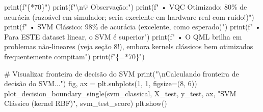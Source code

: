 \documentclass[
  brazilian,
]{report}
\newenvironment{Shaded}{\begin{snugshade}}{\end{snugshade}}
\newcommand{\BuiltInTok}[1]{\textcolor[rgb]{0.00,0.23,0.31}{#1}}
\newcommand{\CharTok}[1]{\textcolor[rgb]{0.13,0.47,0.30}{#1}}
\newcommand{\CommentTok}[1]{\textcolor[rgb]{0.37,0.37,0.37}{#1}}
\newcommand{\DecValTok}[1]{\textcolor[rgb]{0.68,0.00,0.00}{#1}}
\newcommand{\NormalTok}[1]{\textcolor[rgb]{0.00,0.23,0.31}{#1}}
\newcommand{\OperatorTok}[1]{\textcolor[rgb]{0.37,0.37,0.37}{#1}}
\newcommand{\SpecialCharTok}[1]{\textcolor[rgb]{0.37,0.37,0.37}{#1}}
\newcommand{\SpecialStringTok}[1]{\textcolor[rgb]{0.13,0.47,0.30}{#1}}
\newcommand{\StringTok}[1]{\textcolor[rgb]{0.13,0.47,0.30}{#1}}
\begin{document}
\begin{tcolorbox}
\begin{Shaded}
\begin{Highlighting}[]
\BuiltInTok{print}\NormalTok{(}\SpecialStringTok{f"}\SpecialCharTok{\{}\StringTok{\textquotesingle{}{-}\textquotesingle{}}\OperatorTok{*}\DecValTok{70}\SpecialCharTok{\}}\SpecialStringTok{"}\NormalTok{)}
\BuiltInTok{print}\NormalTok{(}\SpecialStringTok{f"}\CharTok{\textbackslash{}n}\SpecialStringTok{💡 Observação:"}\NormalTok{)}
\BuiltInTok{print}\NormalTok{(}\SpecialStringTok{f"   • VQC Otimizado: 80\% de acurácia (razoável em simulador; seria excelente em hardware real com ruído!)"}\NormalTok{)}
\BuiltInTok{print}\NormalTok{(}\SpecialStringTok{f"   • SVM Clássico: 98\% de acurácia (excelente, como esperado)"}\NormalTok{)}
\BuiltInTok{print}\NormalTok{(}\SpecialStringTok{f"   • Para ESTE dataset linear, o SVM é superior"}\NormalTok{)}
\BuiltInTok{print}\NormalTok{(}\SpecialStringTok{f"   • O QML brilha em problemas não{-}lineares (veja seção 8!), embora kernels clássicos bem otimizados frequentemente compitam"}\NormalTok{)}
\BuiltInTok{print}\NormalTok{(}\SpecialStringTok{f"}\SpecialCharTok{\{}\StringTok{\textquotesingle{}=\textquotesingle{}}\OperatorTok{*}\DecValTok{70}\SpecialCharTok{\}}\SpecialStringTok{"}\NormalTok{)}

\CommentTok{\# Visualizar fronteira de decisão do SVM}
\BuiltInTok{print}\NormalTok{(}\StringTok{"}\CharTok{\textbackslash{}n}\StringTok{Calculando fronteira de decisão do SVM..."}\NormalTok{)}
\NormalTok{fig, ax }\OperatorTok{=}\NormalTok{ plt.subplots(}\DecValTok{1}\NormalTok{, }\DecValTok{1}\NormalTok{, figsize}\OperatorTok{=}\NormalTok{(}\DecValTok{8}\NormalTok{, }\DecValTok{6}\NormalTok{))}
\NormalTok{plot\_decision\_boundary\_single(svm\_classical, X\_test, y\_test, ax, }
                              \StringTok{"SVM Clássico (kernel RBF)"}\NormalTok{, svm\_test\_score)}
\NormalTok{plt.show()}
\end{Highlighting}
\end{Shaded}

\end{tcolorbox}
\end{document}
